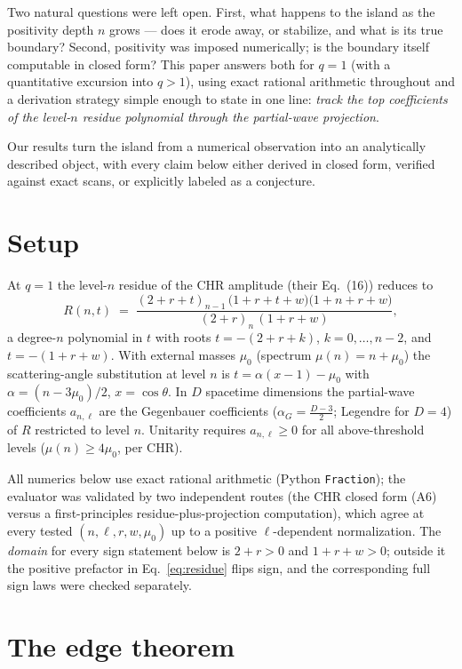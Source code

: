 \documentclass[11pt]{article}
\begin{document}
Two natural questions were left open. First, what happens to the island as the
positivity depth $n$ grows --- does it erode away, or stabilize, and what is
its true boundary? Second, positivity was imposed numerically; is the boundary
itself computable in closed form? This paper answers both for $q=1$ (with a
quantitative excursion into $q>1$), using exact rational arithmetic throughout
and a derivation strategy simple enough to state in one line: \emph{track the
top coefficients of the level-$n$ residue polynomial through the partial-wave
projection}.

Our results turn the island from a numerical observation into an analytically
described object, with every claim below either derived in closed form,
verified against exact scans, or explicitly labeled as a conjecture.

\section{Setup}

At $q=1$ the level-$n$ residue of the CHR amplitude (their Eq.~(16)) reduces to
\begin{equation}
R(n,t)\;=\;\frac{(2+r+t)_{n-1}\,\bigl(1+r+t+w\bigr)\bigl(1+n+r+w\bigr)}
{(2+r)_n\,(1+r+w)},
\label{eq:residue}
\end{equation}
a degree-$n$ polynomial in $t$ with roots $t=-(2+r+k)$, $k=0,\dots,n-2$, and
$t=-(1+r+w)$. With external masses $\mu_0$ (spectrum $\mu(n)=n+\mu_0$) the
scattering-angle substitution at level $n$ is
$t = \alpha(x-1) - \mu_0$ with $\alpha=(n-3\mu_0)/2$, $x=\cos\theta$. In $D$
spacetime dimensions the partial-wave coefficients $a_{n,\ell}$ are the
Gegenbauer coefficients ($\alpha_G=\tfrac{D-3}{2}$; Legendre for $D=4$) of
$R$ restricted to level $n$. Unitarity requires $a_{n,\ell}\ge 0$ for all
above-threshold levels ($\mu(n)\ge 4\mu_0$, per CHR).

All numerics below use exact rational arithmetic (Python \texttt{Fraction});
the evaluator was validated by two independent routes (the CHR closed form
(A6) versus a first-principles residue-plus-projection computation), which
agree at every tested $(n,\ell,r,w,\mu_0)$ up to a positive $\ell$-dependent
normalization. The \emph{domain} for every sign statement below is
$2+r>0$ and $1+r+w>0$; outside it the positive prefactor in
Eq.~\eqref{eq:residue} flips sign, and the corresponding full sign laws were
checked separately.

\section{The edge theorem}
\end{document}
